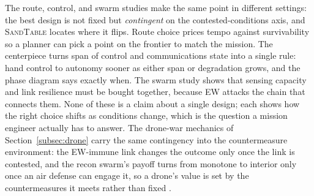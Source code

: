 \documentclass[11pt]{article}
\newcommand{\sandtable}{\textsc{SandTable}}
\begin{document}
The route, control, and swarm studies make the same point in different settings: the best design is not fixed but \emph{contingent} on the contested-conditions axis, and \sandtable{} locates where it flips. Route choice prices tempo against survivability so a planner can pick a point on the frontier to match the mission. The centerpiece turns span of control and communications state into a single rule: hand control to autonomy sooner as either span or degradation grows, and the phase diagram says exactly when. The swarm study shows that sensing capacity and link resilience must be bought together, because EW attacks the chain that connects them. None of these is a claim about a single design; each shows how the right choice shifts as conditions change, which is the question a mission engineer actually has to answer. The drone-war mechanics of Section~\ref{subsec:drone} carry the same contingency into the countermeasure environment: the EW-immune link changes the outcome only once the link is contested, and the recon swarm's payoff turns from monotone to interior only once an air defense can engage it, so a drone's value is set by the countermeasures it meets rather than fixed \citep{kunertova2023depends}.
\end{document}
